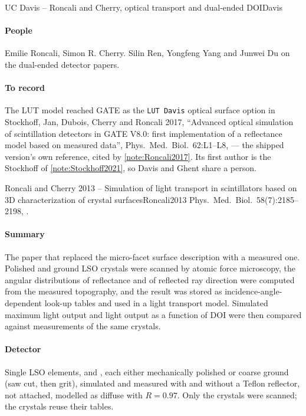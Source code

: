 \begin{programnote}{UC Davis -- Roncali and Cherry, optical transport and dual-ended DOI}{Davis}
\paragraph{People}
Emilie Roncali, Simon R. Cherry. Silin Ren, Yongfeng Yang and Junwei Du on the
dual-ended detector papers.

\paragraph{To record}
The LUT model reached GATE as the \texttt{LUT Davis} optical surface option
in Stockhoff, Jan, Dubois, Cherry and Roncali 2017, ``Advanced optical
simulation of scintillation detectors in GATE V8.0: first implementation of a
reflectance model based on measured data'', Phys.\ Med.\ Biol.\ 62:L1--L8,
 --- the shipped version's own reference, cited
by \ref{note:Roncali2017}. Its first author is the Stockhoff of
\ref{note:Stockhoff2021}, so Davis and Ghent share a person.

\begin{papernote}{Roncali and Cherry 2013 -- Simulation of light transport in scintillators based on 3D characterization of crystal surfaces}{Roncali2013}
Phys.\ Med.\ Biol.\ 58(7):2185--2198, .

\paragraph{Summary}
The paper that replaced the micro-facet surface description with a measured
one. Polished and ground LSO crystals were scanned by atomic force microscopy,
the angular distributions of reflectance and of reflected ray direction were
computed from the measured topography, and the result was stored as
incidence-angle-dependent look-up tables and used in a light transport model.
Simulated maximum light output and light output as a function of DOI were then
compared against measurements of the same crystals.

\paragraph{Detector}
Single LSO elements,  and
, each either mechanically polished or
coarse ground (saw cut, then  grit), simulated and measured with and
without a Teflon reflector, not attached, modelled as diffuse with
$R = 0.97$. Only the  crystals were scanned; the  crystals
reuse their tables.


\end{papernote}
\end{programnote}
